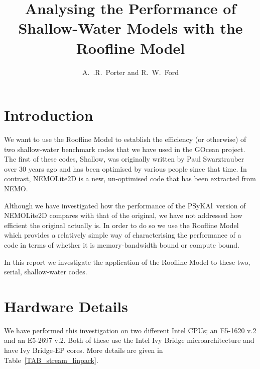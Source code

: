 \documentclass[12pt]{article}
\newcommand{\psykal}{{PS}y{KA}l}
\begin{document}
\title{Analysing the Performance of Shallow-Water Models with the
 Roofline Model}

\author{A.~.R.~Porter and R.~W.~Ford}

\maketitle

\section{Introduction}

We want to use the Roofline Model to establish the efficiency (or
otherwise) of two shallow-water benchmark codes that we have used in
the GOcean project. The first of these codes, Shallow, was originally
written by Paul Swarztrauber over 30 years ago and has been optimised
by various people since that time. In contrast, NEMOLite2D is a new,
un-optimised code that has been extracted from NEMO.

Although we have investigated how the performance of the \psykal\ 
version of NEMOLite2D compares with that of the original, we have not
addressed how efficient the original actually is. In order to do so we
use the Roofline Model~\cite{roofline} which provides a relatively
simple way of characterising the performance of a code in terms of
whether it is memory-bandwidth bound or compute bound.

In this report we investigate the application of the Roofline Model to
these two, serial, shallow-water codes.

\section{Hardware Details}

We have performed this investigation on two different Intel CPUs; an
E5-1620 v.2 and an E5-2697 v.2. Both of these use the Intel Ivy Bridge
microarchitecture and have Ivy Bridge-EP cores. More details are given
in Table~\ref{TAB_stream_linpack}.
\end{document}
